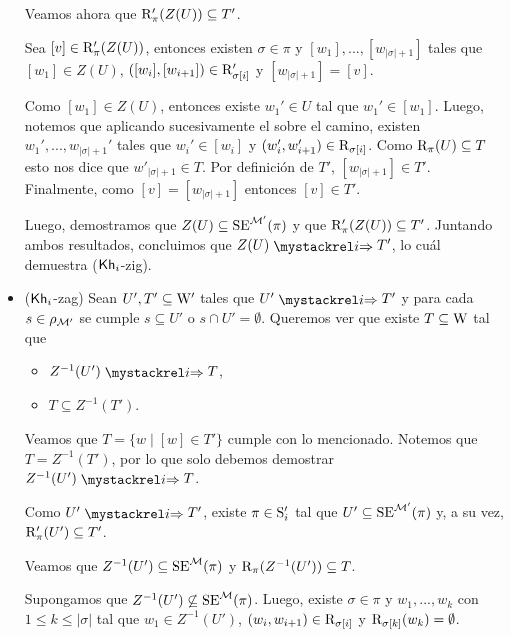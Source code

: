 \begin{demostracion}
\begin{itemize}
        Veamos ahora que $\R'_\pi(Z(U)) \subseteq T'$.

        Sea $[v] \in \R'_\pi(Z(U))$, entonces existen $\sigma \in \pi$ y $[w_1], ..., [w_{|\sigma|+1}]$ tales que 
        $[w_1] \in Z(U)$, $([w_i],[w_{i+1}]) \in \R'_{\sigma[i]}$ y $[w_{|\sigma|+1}] = [v]$.

        Como $[w_1] \in Z(U)$, entonces existe $w_1' \in U$ tal que $w_1'\in [w_1]$. Luego, notemos que aplicando sucesivamente el 
         sobre el camino, existen $w_1',...,w_{|\sigma|+1}'$ tales que $w_i' \in [w_i]$ y $(w_i',w_{i+1}')\in \R_{\sigma[i]}$.
        Como $\R_\pi(U) \subseteq T$ esto nos dice que $w'_{|\sigma|+1} \in T$. Por definición de 
        $T'$, $[w_{|\sigma|+1}] \in T'$. Finalmente, como $[v] = [w_{|\sigma|+1}]$ entonces $[v] \in T'$.

        Luego, demostramos que $Z(U)\subseteq\sexec^{\model'}(\pi)$ y que $\R'_\pi(Z(U)) \subseteq T'$. 
        Juntando ambos resultados, concluimos que $Z(U) \ultsExecAgi T'$, lo cuál demuestra ($\khi$-zig).

       \item ($\khi$-zag) Sean $U', T' \subseteq \W'$ tales que $U' \ultsExecAgi T'$ y para cada $s \in \rho_{\modults'}$ se cumple 
       $s \subseteq U'$ o $s \cap U' = \emptyset$. Queremos ver que existe $T \subseteq \W$ tal que

       \begin{multicols}{2}
            \begin{itemize}
                \item $Z^{-1}(U') \ultsExecAgi T$, 
                \item $T \subseteq Z^{-1}(T')$.
            \end{itemize}
        \end{multicols}

        Veamos que $T = \{w \mid [w] \in T'\}$ cumple con lo mencionado. Notemos que $T = Z^{-1}(T')$, por lo que solo debemos demostrar 
        $Z^{-1}(U') \ultsExecAgi T$.

        Como $U' \ultsExecAgi T'$, existe $\pi \in \S'_i$ tal que $U' \subseteq \sexec^{\model'}(\pi)$ y, a su vez, 
        $\R'_\pi(U') \subseteq T'$.

        Veamos que $Z^{-1}(U') \subseteq \sexec^{\model}(\pi)$ y $\R_\pi(Z^{-1}(U')) \subseteq T$.

        Supongamos que $Z^{-1}(U')\not\subseteq\sexec^{\model}(\pi)$. Luego, existe $\sigma \in \pi$ y $w_1,...,w_k$ con 
        $1 \le k \le |\sigma|$ tal que $w_1\in Z^{-1}(U')$, $(w_i,w_{i+1}) \in \R_{\sigma[i]}$ y $\R_{\sigma[k]}(w_k) = \emptyset$. 


\end{itemize}
\end{demostracion}
